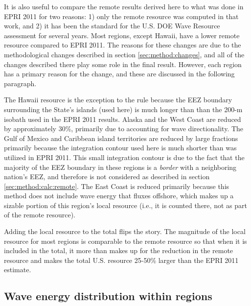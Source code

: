 It is also useful to compare the remote results derived here to what was done in EPRI 2011 for two reasons: 1) only the remote resource was computed in that work, and 2) it has been the standard for the U.S. DOE Wave Resource assessment for several years. 
Most regions, except Hawaii, have a lower remote resource compared to EPRI 2011. The reasons for these changes are due to the methodological changes described in section \ref{sec:method:changes}, and all of the changes described there play some role in the final result. However, each region has a {primary \em} reason for the change, and these are discussed in the following paragraph.

The Hawaii resource is the exception to the rule because the EEZ boundary surrounding the State's islands (used here) is much longer than than the 200-m isobath used in the EPRI 2011 results.
Alaska and the West Coast are reduced by approximately 30\%, primarily due to accounting for wave directionality.
The Gulf of Mexico and Caribbean island territories are reduced by large fractions primarily because the integration contour used here is much shorter than was utilized in EPRI 2011. This small integration contour is due to the fact that the majority of the EEZ boundary in these regions is a {\it border} with a neighboring nation's EEZ, and therefore is not considered as described in section \ref{sec:method:calc:remote}.
The East Coast is reduced primarily because this method does not include wave energy that fluxes offshore, which makes up a sizable portion of this region's local resource (i.e., it is counted there, not as part of the remote resource).

Adding the local resource to the total flips the story. The magnitude of the local resource for most regions is comparable to the remote resource so that when it is included in the total, it more than makes up for the reduction in the remote resource and makes the total U.S. resource 25-50\% larger than the EPRI 2011 estimate.


\subsection{Wave energy distribution within regions}\label{sec:results:wc-dist}

